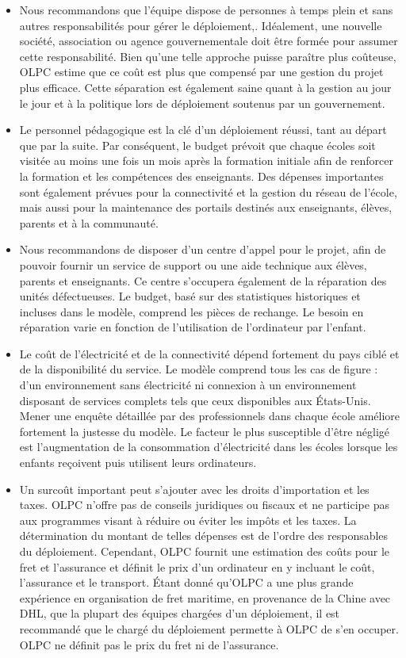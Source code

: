 \documentclass[11pt]{article}
\begin{document}
\begin{itemize}
\item Nous recommandons que l'équipe dispose de personnes à temps plein et sans
  autres responsabilités pour gérer le déploiement,. Idéalement, une
  nouvelle société, association ou agence gouvernementale doit être formée
  pour assumer cette responsabilité. Bien qu'une telle approche puisse
  paraître plus coûteuse, OLPC estime que ce coût est plus que compensé par
  une gestion du projet plus efficace. Cette séparation est également saine
  quant à la gestion au jour le jour et à la politique lors de déploiement
  soutenus par un gouvernement.
\item Le personnel pédagogique est la clé d'un déploiement réussi, tant au
  départ que par la suite. Par conséquent, le budget prévoit que chaque
  écoles soit visitée au moins une fois un mois après la formation initiale
  afin de renforcer la formation et les compétences des enseignants. Des
  dépenses importantes sont également prévues pour la connectivité et la
  gestion du réseau de l'école, mais aussi pour la maintenance des portails
  destinés aux enseignants, élèves, parents et à la communauté.
\item Nous recommandons de disposer d'un centre d'appel pour le projet, afin de
  pouvoir fournir un service de support ou une aide technique aux élèves,
  parents et enseignants. Ce centre s'occupera également de la réparation
  des unités défectueuses. Le budget, basé sur des statistiques historiques
  et incluses dans le modèle, comprend les pièces de rechange. Le besoin en
  réparation varie en fonction de l'utilisation de l'ordinateur par
  l'enfant.
\item Le coût de l'électricité et de la connectivité dépend fortement du pays
  ciblé et de la disponibilité du service. Le modèle comprend tous les cas
  de figure : d'un environnement sans électricité ni connexion à un
  environnement disposant de services complets tels que ceux disponibles
  aux États-Unis. Mener une enquête détaillée par des professionnels dans
  chaque école améliore fortement la justesse du modèle. Le facteur le plus
  susceptible d'être négligé est l'augmentation de la consommation
  d'électricité dans les écoles lorsque les enfants reçoivent puis
  utilisent leurs ordinateurs.
\item Un surcoût important peut s'ajouter avec les droits d'importation et les
  taxes. OLPC n'offre pas de conseils juridiques ou fiscaux et ne participe
  pas aux programmes visant à réduire ou éviter les impôts et les taxes. La
  détermination du montant de telles dépenses est de l'ordre des
  responsables du déploiement. Cependant, OLPC fournit une estimation des
  coûts pour le fret et l'assurance et définit le prix d'un ordinateur en y
  incluant le coût, l'assurance et le transport. Étant donné qu'OLPC a une
  plus grande expérience en organisation de fret maritime, en provenance de
  la Chine avec DHL, que la plupart des équipes chargées d'un déploiement,
  il est recommandé que le chargé du déploiement permette à OLPC de s'en
  occuper. OLPC ne définit pas le prix du fret ni de l'assurance.
\end{itemize}
\end{document}
